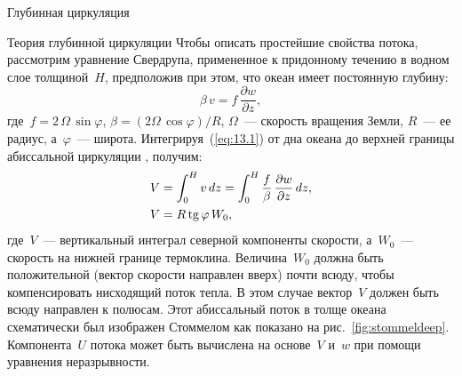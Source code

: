 \begin{chapter}{Глубинная циркуляция}
\begin{section}{Теория глубинной циркуляции}
Чтобы описать простейшие свойства потока, рассмотрим уравнение Свердрупа,
примененное к придонному течению в водном слое толщиной~$H$, предположив
при этом, что океан имеет постоянную глубину:
\begin{equation}\label{eq:13.1}
 \beta\,v =f\,\frac{\partial{w}}{\partial{z}},
\end{equation}
где~$f =2\,\Omega\,\sin \varphi$, 
$\beta = \left(2\Omega\,\cos \varphi \right)/{R}$, $\Omega$~--- скорость
вращения Земли, $R$~--- ее радиус, а~$\varphi$~--- широта. 
Интегрируя~(\ref{eq:13.1}) от дна океана до верхней границы абиссальной 
циркуляции%
, получим:
\begin{align}
  V &= \int_{0}^{H} v\,dz = \int_{0}^{H}
       \frac{f}{\beta}\,\frac{\partial{w}}{\partial{z}}\,dz, \notag \\
  V &= R \mathop{\mathrm{tg}}\nolimits \varphi \,W_0,\label{eq:13.2}
\end{align}
где~$V$~--- вертикальный интеграл северной компоненты скорости, 
а~$W_0$~--- скорость на нижней границе 
термоклина. 
Величина~$W_0$ должна быть положительной (вектор скорости направлен вверх) 
почти всюду, чтобы компенсировать нисходящий поток 
тепла. В этом случае вектор~$V$ должен быть всюду направлен к полюсам.
Этот абиссальный поток в толще океана схематически был изображен Стоммелом
как показано на рис.~\ref{fig:stommeldeep}. Компонента~$U$ потока может быть
вычислена на основе~$V$ и~$w$ при помощи уравнения неразрывности.
%


\end{section}
\end{chapter}
